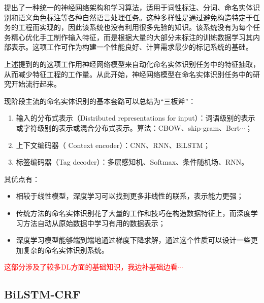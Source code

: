 \documentclass[a4paper,UTF8,no-math]{ctexart}
\begin{document}
	
	\citep{collobert2011natural}提出了一种统一的神经网络架构和学习算法，适用于词性标注、分词、命名实体识别和语义角色标注等各种自然语言处理任务。这种多样性是通过避免构造特定于任务的工程而实现的，因此该系统也没有利用很多先验的知识。该系统没有为每个任务精心优化手工制作输入特征，而是根据大量的大部分未标注的训练数据学习其内部表示。这项工作可作为构建一个性能良好、计算需求最少的标记系统的基础。
	
	上述提到的\citep{collobert2011natural}的这项工作用神经网络模型来自动化命名实体识别任务中的特征抽取，从而减少特征工程的工作量。从此开始，神经网络模型在命名实体识别任务中的研究开始流行起来。
	
	现阶段主流的命名实体识别的基本套路可以总结为“三板斧”：
	
	\begin{enumerate}
\item 输入的分布式表示（Distributed representations for input）：词语级别的表示或字符级别的表示或混合分布式表示。算法：CBOW、skip-gram、Bert$\cdots$；
\item 上下文编码器（ Context encoder）：CNN、RNN、BiLSTM；
\item 标签编码器（Tag decoder）：多层感知机、Softmax、条件随机场、RNN。
	\end{enumerate}
	
	
	其优点有：
	
	\begin{itemize}
\item 相较于线性模型，深度学习可以找到更多非线性的联系，表示能力更强；
\item 传统方法的命名实体识别花了大量的工作和技巧在构造数据特征上，而深度学习方法自动从原始数据中学习有用的数据表示；
\item 深度学习模型能够端到端地通过梯度下降求解，通过这个性质可以设计一些更加复杂的命名实体识别系统。
	\end{itemize}


	\textcolor{red}{这部分涉及了较多DL方面的基础知识，我边补基础边看$\cdots$}
	\subsection{BiLSTM-CRF}
	
	\citep{bilstm-crf}
	
\end{document}
